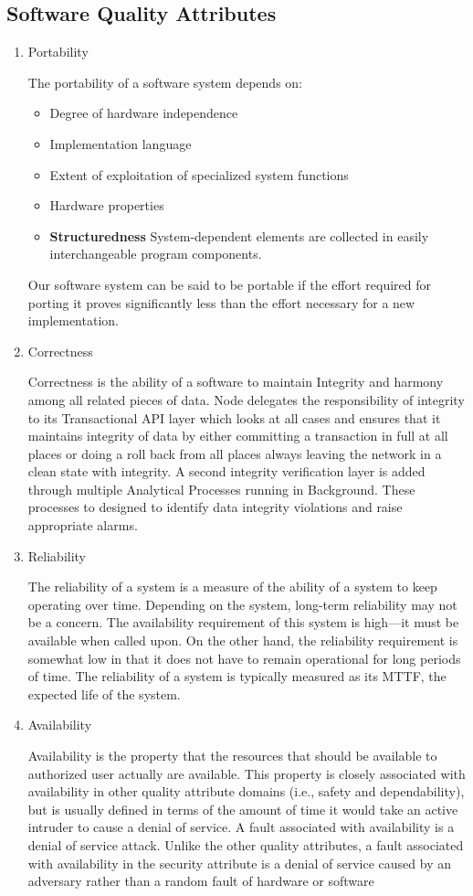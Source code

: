 \documentclass[oneside,a4paper,12pt]{book}
\begin{document}
\subsection{Software Quality Attributes}
\begin{enumerate}
    \item Portability
    \par The portability of a software system depends on:
    \begin{itemize}
        \item Degree of hardware independence
        \item Implementation language
        \item Extent of exploitation of specialized system functions
        \item Hardware properties
        \item \textbf{Structuredness} System-dependent elements are collected in easily interchangeable program components.
    \end{itemize}
    Our software system can be said to be portable if the effort required for porting it proves significantly less than the effort necessary for a new implementation.
    \item Correctness
    \par 
Correctness  is the ability of a software to maintain Integrity and harmony among all related pieces of data. Node delegates the responsibility of integrity to its Transactional API layer which looks at all cases and ensures that it maintains integrity of data by either committing a transaction in full at all places or doing a roll back from all places always leaving the network in a clean state with integrity. A second integrity verification layer is added through multiple Analytical Processes running in Background. These processes to designed to identify data integrity violations and raise appropriate alarms.
\item Reliability
\par 
The reliability of a system is a measure of the ability of a system to keep operating over time. Depending on the system, long-term reliability may not be a concern. The availability requirement of this system is high—it must be available when called upon. On the other hand, the reliability requirement is somewhat low in that it does not have to remain operational for long periods of time. The reliability of a system is typically measured as its MTTF, the expected life of the system.
\item Availability
\par 
Availability is the property that the resources that should be available to authorized user actually are available. This property is closely associated with availability in other quality attribute domains (i.e., safety and dependability), but is usually defined in terms of the amount of time it would take an active intruder to cause a denial of service. A fault associated with availability is a denial of service attack. Unlike the other quality attributes, a fault associated with availability in the security attribute is a denial of service caused by an adversary rather than a random fault of hardware or software
\end{enumerate}
\end{document}
